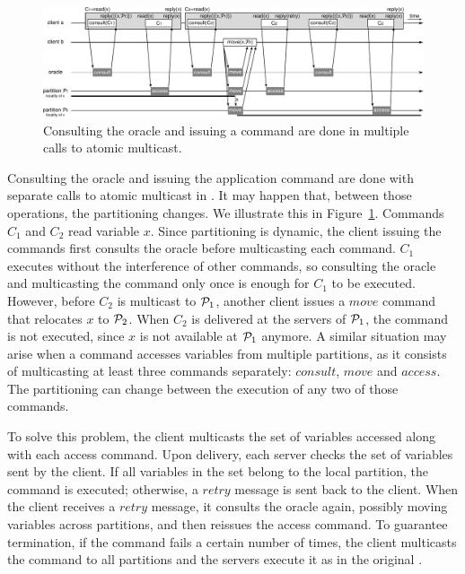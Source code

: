 \begin{figure}
\begin{minipage}[b]{1.0\linewidth}
\centering
      \includegraphics[width=1\linewidth]{figures/dssmr-detail}
\end{minipage}
\caption{Consulting the oracle and issuing a command are done in multiple calls to atomic multicast.}
\label{fig:dssmr-detail}
\end{figure}

Consulting the oracle and issuing the application command are done with separate
calls to atomic multicast in \dssmr{}. It may happen that, between those
operations, the partitioning changes. We illustrate this in
Figure~\ref{fig:dssmr-detail}. Commands $C_1$ and $C_2$ read variable $x$. Since
partitioning is dynamic, the client issuing the commands first consults the
oracle before multicasting each command. $C_1$ executes without the interference
of other commands, so consulting the oracle and multicasting the command only
once is enough for $C_1$ to be executed. However, before $C_2$ is multicast to
$\mathcal{P}_1$, another client issues a $move$ command that relocates $x$ to $\mathcal{P}_2$.
When $C_2$ is delivered at the servers of $\mathcal{P}_1$, the command is not executed,
since $x$ is not available at $\mathcal{P}_1$ anymore. A similar situation may arise
when a command accesses variables from multiple partitions, as it consists of
multicasting at least three commands separately: $consult$, $move$ and $access$.
The partitioning can change between the execution of any two of those commands.

To solve this problem, the client multicasts the set of variables accessed along
with each access command. Upon delivery, each server checks the set of variables
sent by the client. If all variables in the set belong to the local partition,
the command is executed; otherwise, a $retry$ message is sent back to the
client. When the client receives a $retry$ message, it consults the oracle
again, possibly moving variables across partitions, and then reissues the access
command. To guarantee termination, if the command fails a certain number of
times, the client multicasts the command to all partitions and the servers
execute it as in the original \ssmr{}.


